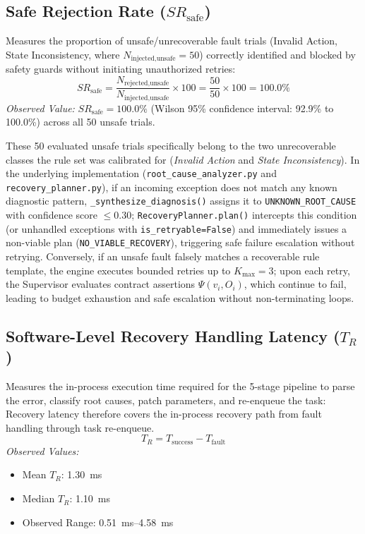 \documentclass[conference]{IEEEtran}
\newcommand{\chg}[1]{{\color{blue}#1}}
\begin{document}
\subsection{Safe Rejection Rate ($SR_{\text{safe}}$)}
Measures the proportion of unsafe/unrecoverable fault trials (Invalid Action, State Inconsistency, where $N_{\text{injected,unsafe}} = 50$) correctly identified and blocked by safety guards without initiating unauthorized retries:
\begin{equation}
SR_{\text{safe}} = \frac{N_{\text{rejected,unsafe}}}{N_{\text{injected,unsafe}}} \times 100 = \frac{50}{50} \times 100 = 100.0\%
\end{equation}
\textit{Observed Value:} $SR_{\text{safe}} = 100.0\%$ \chg{(Wilson 95\% confidence interval: 92.9\% to 100.0\%)} across all 50 unsafe trials.

\chg{These 50 evaluated unsafe trials specifically belong to the two unrecoverable classes the rule set was calibrated for (\textit{Invalid Action} and \textit{State Inconsistency}). In the underlying implementation (\texttt{root\_cause\_analyzer.py} and \texttt{recovery\_planner.py}), if an incoming exception does not match any known diagnostic pattern, \texttt{\_synthesize\_diagnosis()} assigns it to \texttt{UNKNOWN\_ROOT\_CAUSE} with confidence score $\le 0.30$; \texttt{RecoveryPlanner.plan()} intercepts this condition (or unhandled exceptions with \texttt{is\_retryable=False}) and immediately issues a non-viable plan (\texttt{NO\_VIABLE\_RECOVERY}), triggering safe failure escalation without retrying. Conversely, if an unsafe fault falsely matches a recoverable rule template, the engine executes bounded retries up to $K_{\text{max}} = 3$; upon each retry, the Supervisor evaluates contract assertions $\Psi(v_i, O_i)$, which continue to fail, leading to budget exhaustion and safe escalation without non-terminating loops.}

\subsection{Software-Level Recovery Handling Latency ($T_R$)}
Measures the in-process execution time required for the 5-stage pipeline to parse the error, classify root causes, patch parameters, and re-enqueue the task: Recovery latency therefore covers the in-process recovery path from fault handling through task re-enqueue.
\begin{equation}
T_R = T_{\text{success}} - T_{\text{fault}}
\end{equation}
\textit{Observed Values:}
\begin{itemize}
    \item Mean $T_R$: 1.30~ms
    \item Median $T_R$: 1.10~ms
    \item Observed Range: 0.51~ms--4.58~ms
\end{itemize}
\end{document}
